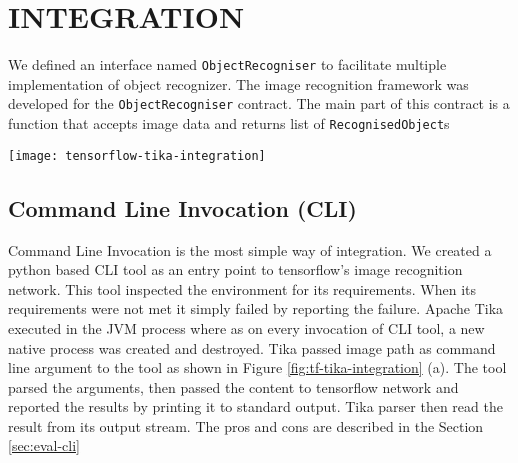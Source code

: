 \section{INTEGRATION} \label{sec:integration}
We defined an interface named \texttt{ObjectRecogniser} to facilitate multiple implementation of object recognizer. The image recognition framework was developed for the \texttt{ObjectRecogniser} contract. The main part of this contract is a function that accepts image data and returns list of \texttt{RecognisedObject}s


\iffalse
The following methods of integration were investigated in the order of listing:
\begin{itemize}
\item Command Line Invocation
\item Java Native Interface
\item gRPC Remote Procedure Calls
\item Representational State Transfer API
\end{itemize}
\fi

\begin{figure*}
	\texttt{[image: tensorflow-tika-integration]}
	\caption{Tika and Tensorflow Integration}
	\label{fig:tf-tika-integration}
\end{figure*}

\subsection{Command Line Invocation (CLI)} \label{sec:int-cli}
Command Line Invocation is the most simple way of integration. We created a python based CLI tool as an entry point to tensorflow's image recognition network. This tool inspected the environment for its requirements. When its requirements were not met it simply failed by reporting the failure. 
Apache Tika executed in the JVM process where as on every invocation of CLI tool, a new native process was created and destroyed. Tika passed image path as command line argument to the tool as shown in Figure \ref{fig:tf-tika-integration} (a). The tool parsed the arguments, then passed the content to tensorflow network and reported the results by printing it to standard output. Tika parser then read the result from its output stream. The pros and cons are described in the Section \ref{sec:eval-cli}

